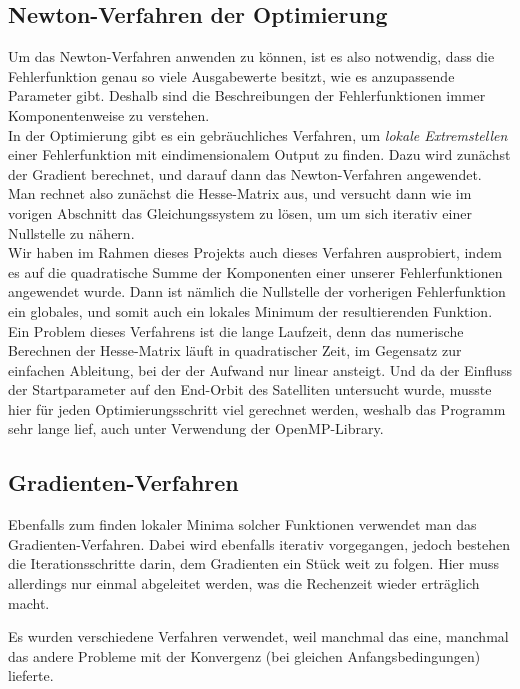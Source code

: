 \subsection{Newton-Verfahren der Optimierung}

Um das Newton-Verfahren anwenden zu können, ist es also notwendig, dass die Fehlerfunktion genau so viele Ausgabewerte besitzt, wie es anzupassende Parameter gibt. Deshalb sind die Beschreibungen der Fehlerfunktionen immer Komponentenweise zu verstehen.\\
In der Optimierung gibt es ein gebräuchliches Verfahren, um \textit{lokale Extremstellen} einer Fehlerfunktion mit eindimensionalem Output zu finden. Dazu wird zunächst der Gradient berechnet, und darauf dann das Newton-Verfahren angewendet. Man rechnet also zunächst die Hesse-Matrix aus, und versucht dann wie im vorigen Abschnitt das Gleichungssystem zu lösen, um um sich iterativ einer Nullstelle zu nähern. \\
Wir haben im Rahmen dieses Projekts auch dieses Verfahren ausprobiert, indem es auf die quadratische Summe der Komponenten einer unserer Fehlerfunktionen angewendet wurde. Dann ist nämlich die Nullstelle der vorherigen Fehlerfunktion ein globales, und somit auch ein lokales Minimum der resultierenden Funktion. \\
Ein Problem dieses Verfahrens ist die lange Laufzeit, denn das numerische Berechnen der Hesse-Matrix läuft in quadratischer Zeit, im Gegensatz zur einfachen Ableitung, bei der der Aufwand nur linear ansteigt. Und da der Einfluss der Startparameter auf den End-Orbit des Satelliten untersucht wurde, musste hier für jeden Optimierungsschritt viel gerechnet werden, weshalb das Programm sehr lange lief, auch unter Verwendung der OpenMP-Library.


\subsection{Gradienten-Verfahren}

Ebenfalls zum finden lokaler Minima solcher Funktionen verwendet man das Gradienten-Verfahren. Dabei wird ebenfalls iterativ vorgegangen, jedoch bestehen die Iterationsschritte darin, dem Gradienten ein Stück weit zu folgen. Hier muss allerdings nur einmal abgeleitet werden, was die Rechenzeit wieder erträglich macht.

\vspace{1.5cm}

Es wurden verschiedene Verfahren verwendet, weil manchmal das eine, manchmal das andere Probleme mit der Konvergenz (bei gleichen Anfangsbedingungen) lieferte.

